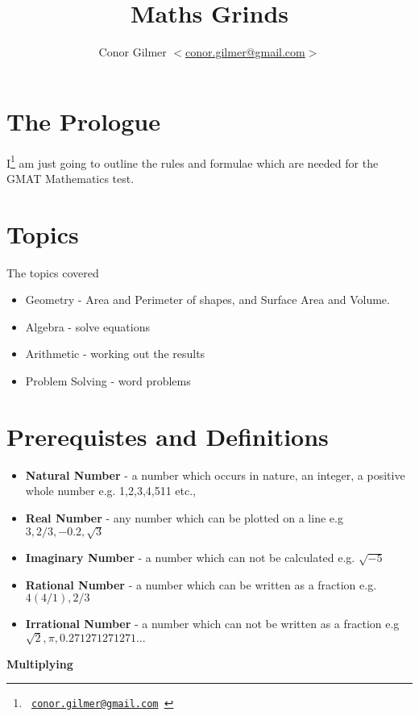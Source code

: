 \documentclass{article}
\title{\st{} Maths Grinds}
\author{Conor Gilmer $<$\href{mailto:conor.gilmer@gmail.com}{conor.gilmer@gmail.com}$>$}
\newcommand{\email}[1]{\texttt{#1}}
\begin{document}
\pagestyle{headings}
\maketitle

\tableofcontents


\newpage
\section{The Prologue}
I\footnote{\email{ \href{mailto:conor.gilmer@gmail.com.com}{conor.gilmer@gmail.com} }} am just going to outline the rules and formulae which are needed for the GMAT Mathematics test.

\newpage
\section{Topics}

The topics covered

\begin{itemize}
\item Geometry - Area and Perimeter of shapes, and Surface Area and Volume.
\item Algebra - solve equations
\item Arithmetic - working out the results
\item Problem Solving - word problems
\end{itemize}


\newpage
\section{Prerequistes and Definitions}
\begin{itemize}
\item \textbf{Natural Number} - a number which occurs in nature, an integer, a positive whole number e.g. 1,2,3,4,511 etc.,
\item \textbf{Real Number} - any number which can be plotted on a line e.g $3, 2/3, -0.2, \sqrt{3}$
\item \textbf{Imaginary Number} - a number which can not be calculated e.g. $\sqrt{-5}$
\item \textbf{Rational Number} - a number which can be written as a fraction e.g. $4 (4/1) , 2/3$
\item \textbf{Irrational Number} - a number which can not be written as a fraction e.g $\sqrt{2}, \pi, 0.271271271271...$
\end{itemize}

\textbf{Multiplying}
\end{document}
